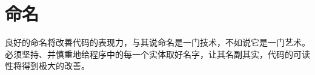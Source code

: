 \begin{savequote}[45mm]
\end{savequote}

\chapter{命名} 
\label{ch:naming}

\begin{content}

良好的命名将改善代码的表现力，与其说命名是一门技术，不如说它是一门艺术。必须坚持、并慎重地给程序中的每一个实体取好名字，让其名副其实，代码的可读性将得到极大的改善。

\end{content}

